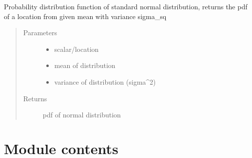 \documentclass[letterpaper,12pt,english]{sphinxmanual}
\begin{document}
\begin{fulllineitems}
\label{\detokenize{PARyOpt:PARyOpt.utils.pdf_normal}}
\sphinxAtStartPar
Probability distribution function of standard normal distribution,
returns the pdf of a location from given mean with variance sigma\_sq
\begin{quote}\begin{description}
\item[{Parameters}] \leavevmode\begin{itemize}
\item {} 
\sphinxAtStartPar
{} \textendash{} scalar/location

\item {} 
\sphinxAtStartPar
{} \textendash{} mean of distribution

\item {} 
\sphinxAtStartPar
{} \textendash{} variance of distribution (sigma\textasciicircum{}2)

\end{itemize}

\item[{Returns}] \leavevmode
\sphinxAtStartPar
pdf of normal distribution

\end{description}\end{quote}

\end{fulllineitems}



\section{Module contents}
\label{\detokenize{PARyOpt:module-PARyOpt}}\label{\detokenize{PARyOpt:module-contents}}
\end{document}
